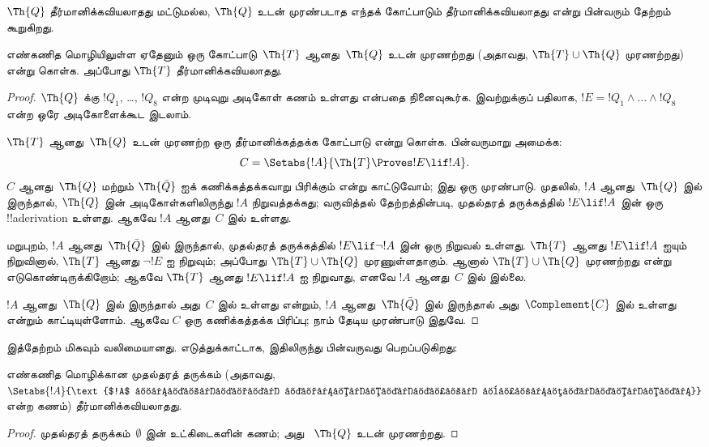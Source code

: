 \documentclass[../../../include/open-logic-section]{subfiles}
\begin{document}



$\Th{Q}$ தீர்மானிக்கவியலாதது மட்டுமல்ல, $\Th{Q}$ உடன் முரண்படாத எந்தக்
கோட்பாடும் தீர்மானிக்கவியலாதது என்று பின்வரும் தேற்றம் கூறுகிறது.

\begin{thm}
எண்கணித மொழியிலுள்ள ஏதேனும் ஒரு கோட்பாடு~$\Th{T}$ ஆனது~$\Th{Q}$ உடன்
முரணற்றது (அதாவது, $\Th{T} \cup \Th{Q}$ முரணற்றது) என்று கொள்க.
அப்போது $\Th{T}$ தீர்மானிக்கவியலாதது.
\end{thm}

\begin{proof}
$\Th{Q}$ க்கு $!Q_1$, \dots, $!Q_8$ என்ற முடிவுறு அடிகோள் கணம் உள்ளது
என்பதை நினைவுகூர்க. இவற்றுக்குப் பதிலாக,
$!E = !Q_1 \land \dots \land !Q_8$ என்ற ஒரே அடிகோளைக்கூட இடலாம்.

$\Th{T}$ ஆனது~$\Th{Q}$ உடன் முரணற்ற ஒரு தீர்மானிக்கத்தக்க கோட்பாடு என்று
கொள்க. பின்வருமாறு அமைக்க:
\[
C = \Setabs{!A}{\Th{T} \Proves !E \lif !A}.
\]
$C$ ஆனது~$\Th{Q}$ மற்றும் $\Th{\bar Q}$ ஐக் கணிக்கத்தக்கவாறு பிரிக்கும்
என்று காட்டுவோம்; இது ஒரு முரண்பாடு. முதலில், $!A$ ஆனது~$\Th{Q}$ இல்
இருந்தால், $\Th{Q}$ இன் அடிகோள்களிலிருந்து $!A$ நிறுவத்தக்கது;
வருவித்தல் தேற்றத்தின்படி, முதல்தரத் தருக்கத்தில் $!E \lif !A$ இன் ஒரு
!!a{derivation} உள்ளது. ஆகவே $!A$ ஆனது~$C$ இல் உள்ளது.

மறுபுறம், $!A$ ஆனது~$\Th{\bar Q}$ இல் இருந்தால், முதல்தரத் தருக்கத்தில்
$!E \lif \lnot !A$ இன் ஒரு நிறுவல் உள்ளது. $\Th{T}$ ஆனது
$!E \lif !A$ ஐயும் நிறுவினால், $\Th{T}$ ஆனது $\lnot !E$ ஐ நிறுவும்;
அப்போது $\Th{T} \cup \Th{Q}$ முரணுள்ளதாகும். ஆனால்
$\Th{T} \cup \Th{Q}$ முரணற்றது என்று எடுகொண்டிருக்கிறோம்; ஆகவே
$\Th{T}$ ஆனது $!E \lif !A$ ஐ நிறுவாது, எனவே $!A$ ஆனது~$C$ இல் இல்லை.

$!A$ ஆனது~$\Th{Q}$ இல் இருந்தால் அது~$C$ இல் உள்ளது என்றும்,
$!A$ ஆனது~$\Th{\bar Q}$ இல் இருந்தால் அது~$\Complement{C}$ இல் உள்ளது
என்றும் காட்டியுள்ளோம். ஆகவே $C$ ஒரு கணிக்கத்தக்க பிரிப்பு; நாம் தேடிய
முரண்பாடு இதுவே.
\end{proof}

இத்தேற்றம் மிகவும் வலிமையானது. எடுத்துக்காட்டாக, இதிலிருந்து பின்வருவது
பெறப்படுகிறது:

\begin{cor}
  எண்கணித மொழிக்கான முதல்தரத் தருக்கம் (அதாவது,
  $\Setabs{!A}{\text{$!A$ முதல்தரத் தருக்கத்தில் நிறுவத்தக்கது}}$ என்ற
  கணம்) தீர்மானிக்கவியலாதது.
\end{cor}

\begin{proof}
முதல்தரத் தருக்கம்~$\emptyset$ இன் உட்கிடைகளின் கணம்; அது
~$\Th{Q}$ உடன் முரணற்றது.
\end{proof}
\end{document}
